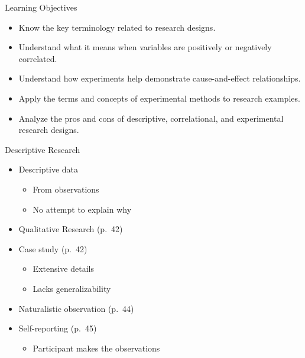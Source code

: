 \documentclass[
]{book}
\providecommand{\tightlist}{%
  \setlength{\itemsep}{0pt}\setlength{\parskip}{0pt}}
\begin{document}
Learning Objectives

\begin{itemize}
\tightlist
\item
  Know the key terminology related to research designs.\\
\item
  Understand what it means when variables are positively or negatively correlated.\\
\item
  Understand how experiments help demonstrate cause-and-effect relationships.\\
\item
  Apply the terms and concepts of experimental methods to research examples.\\
\item
  Analyze the pros and cons of descriptive, correlational, and experimental research designs.
\end{itemize}

Descriptive Research

\begin{itemize}
\tightlist
\item
  Descriptive data

  \begin{itemize}
  \tightlist
  \item
    From observations\\
  \item
    No attempt to explain why\\
  \end{itemize}
\item
  Qualitative Research (p.~42)\\
\item
  Case study (p.~42)

  \begin{itemize}
  \tightlist
  \item
    Extensive details\\
  \item
    Lacks generalizability\\
  \end{itemize}
\item
  Naturalistic observation (p.~44)\\
\item
  Self-reporting (p.~45)

  \begin{itemize}
  \tightlist
  \item
    Participant makes the observations
  \end{itemize}
\end{itemize}
\end{document}
